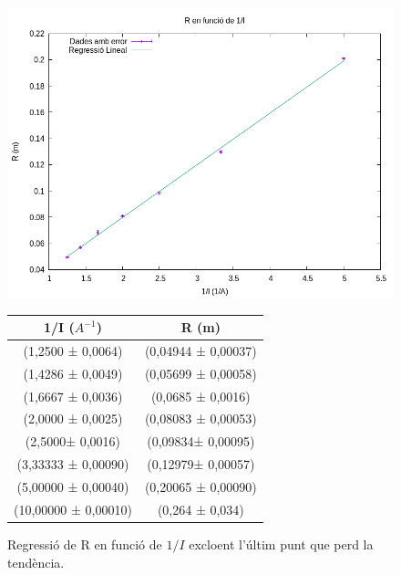 \documentclass[11pt]{article}
\begin{document}
\begin{figure}[h]
    \centering
    \begin{minipage}{0.45\textwidth}
        \centering
        \includegraphics[width=\textwidth]{RvsI.png}
        \caption{Regressió de R en funció de $1/I$ excloent l'últim punt que perd la tendència.}
        \label{fig: RvsI}
    \end{minipage}
    \hfill
    \begin{minipage}{0.45\textwidth} 
        \centering
        \begin{tabular}{|c|c|}
            \hline
            1/I ($A^{-1}$)	&	R (m)	\\\hline
            (1,2500 ± 0,0064)	&	(0,04944 ± 0,00037)	\\\hline
            (1,4286 ± 0,0049)	&	(0,05699 ± 0,00058)	\\\hline
            (1,6667 ± 0,0036)	&	(0,0685 ± 0,0016)	\\\hline
            (2,0000 ± 0,0025)	&	(0,08083 ± 0,00053)	\\\hline
            (2,5000± 0,0016)	&	(0,09834± 0,00095)	\\\hline
            (3,33333 ± 0,00090)	&	(0,12979± 0,00057)	\\\hline
            (5,00000 ± 0,00040)	&	(0,20065 ± 0,00090)	\\\hline
            (10,00000 ± 0,00010)	&	(0,264 ± 0,034)	\\\hline
            
        \end{tabular}
        \label{tab:RvsI}
    \end{minipage}
\end{figure}
\end{document}
